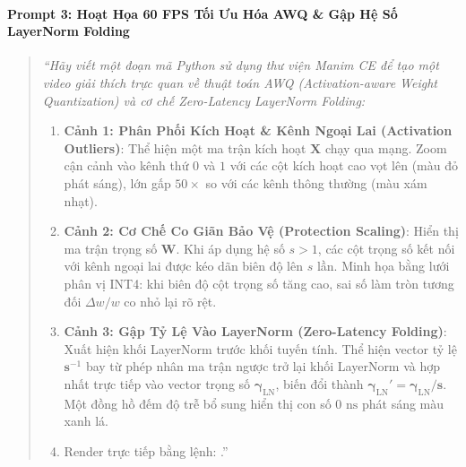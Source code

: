 \begin{simulationbox}
\paragraph{Prompt 3: Hoạt Họa 60 FPS Tối Ưu Hóa AWQ \& Gập Hệ Số LayerNorm Folding}
\begin{quote}\small\itshape
``Hãy viết một đoạn mã Python sử dụng thư viện Manim CE để tạo một video giải thích trực quan về thuật toán AWQ (Activation-aware Weight Quantization) và cơ chế Zero-Latency LayerNorm Folding:
\begin{enumerate}
  \item \textbf{Cảnh 1: Phân Phối Kích Hoạt \& Kênh Ngoại Lai (Activation Outliers)}: Thể hiện một ma trận kích hoạt $\mathbf{X}$ chạy qua mạng. Zoom cận cảnh vào kênh thứ $0$ và $1$ với các cột kích hoạt cao vọt lên (màu đỏ phát sáng), lớn gấp $50\times$ so với các kênh thông thường (màu xám nhạt).
  \item \textbf{Cảnh 2: Cơ Chế Co Giãn Bảo Vệ (Protection Scaling)}: Hiển thị ma trận trọng số $\mathbf{W}$. Khi áp dụng hệ số $s > 1$, các cột trọng số kết nối với kênh ngoại lai được kéo dãn biên độ lên $s$ lần. Minh họa bằng lưới phân vị INT4: khi biên độ cột trọng số tăng cao, sai số làm tròn tương đối $\Delta w / w$ co nhỏ lại rõ rệt.
  \item \textbf{Cảnh 3: Gập Tỷ Lệ Vào LayerNorm (Zero-Latency Folding)}: Xuất hiện khối LayerNorm trước khối tuyến tính. Thể hiện vector tỷ lệ $\mathbf{s}^{-1}$ bay từ phép nhân ma trận ngược trở lại khối LayerNorm và hợp nhất trực tiếp vào vector trọng số $\boldsymbol{\gamma}_{\text{LN}}$, biến đổi thành $\boldsymbol{\gamma}_{\text{LN}}' = \boldsymbol{\gamma}_{\text{LN}} / \mathbf{s}$. Một đồng hồ đếm độ trễ bổ sung hiển thị con số $0\text{ ns}$ phát sáng màu xanh lá.
  \item Render trực tiếp bằng lệnh: .''
\end{enumerate}
\end{quote}


\end{simulationbox}
